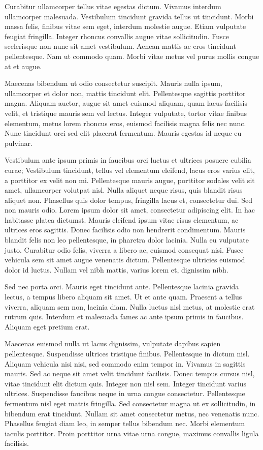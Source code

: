 Curabitur ullamcorper tellus vitae egestas dictum. Vivamus interdum ullamcorper
malesuada. Vestibulum tincidunt gravida tellus ut tincidunt. Morbi massa felis,
finibus vitae sem eget, interdum molestie augue. Etiam vulputate feugiat
fringilla. Integer rhoncus convallis augue vitae sollicitudin. Fusce
scelerisque non nunc sit amet vestibulum. Aenean mattis ac eros tincidunt
pellentesque. Nam ut commodo quam. Morbi vitae metus vel purus mollis congue at
et augue.

Maecenas bibendum ut odio consectetur suscipit. Mauris nulla ipsum, ullamcorper
et dolor non, mattis tincidunt elit. Pellentesque sagittis porttitor magna.
Aliquam auctor, augue sit amet euismod aliquam, quam lacus facilisis velit, et
tristique mauris sem vel lectus. Integer vulputate, tortor vitae finibus
elementum, metus lorem rhoncus eros, euismod facilisis magna felis nec nunc.
Nunc tincidunt orci sed elit placerat fermentum. Mauris egestas id neque eu
pulvinar.

Vestibulum ante ipsum primis in faucibus orci luctus et ultrices posuere
cubilia curae; Vestibulum tincidunt, tellus vel elementum eleifend, lacus eros
varius elit, a porttitor ex velit non mi. Pellentesque mauris augue, porttitor
sodales velit sit amet, ullamcorper volutpat nisl. Nulla aliquet neque risus,
quis blandit risus aliquet non. Phasellus quis dolor tempus, fringilla lacus
et, consectetur dui. Sed non mauris odio. Lorem ipsum dolor sit amet,
consectetur adipiscing elit. In hac habitasse platea dictumst. Mauris eleifend
ipsum vitae risus elementum, ac ultrices eros sagittis. Donec facilisis odio
non hendrerit condimentum. Mauris blandit felis non leo pellentesque, in
pharetra dolor lacinia. Nulla eu vulputate justo. Curabitur odio felis, viverra
a libero ac, euismod consequat nisi. Fusce vehicula sem sit amet augue
venenatis dictum. Pellentesque ultricies euismod dolor id luctus. Nullam vel
nibh mattis, varius lorem et, dignissim nibh.

Sed nec porta orci. Mauris eget tincidunt ante. Pellentesque lacinia gravida
lectus, a tempus libero aliquam sit amet. Ut et ante quam. Praesent a tellus
viverra, aliquam sem non, lacinia diam. Nulla luctus nisl metus, at molestie
erat rutrum quis. Interdum et malesuada fames ac ante ipsum primis in faucibus.
Aliquam eget pretium erat.

Maecenas euismod nulla ut lacus dignissim, vulputate dapibus sapien
pellentesque. Suspendisse ultrices tristique finibus. Pellentesque in dictum
nisl. Aliquam vehicula nisi nisi, sed commodo enim tempor in. Vivamus in
sagittis mauris. Sed ac neque sit amet velit tincidunt facilisis. Donec tempus
cursus nisl, vitae tincidunt elit dictum quis. Integer non nisl sem. Integer
tincidunt varius ultrices. Suspendisse faucibus neque in urna congue
consectetur. Pellentesque fermentum nisl eget mattis fringilla. Sed consectetur
magna ut ex sollicitudin, in bibendum erat tincidunt. Nullam sit amet
consectetur metus, nec venenatis nunc. Phasellus feugiat diam leo, in semper
tellus bibendum nec. Morbi elementum iaculis porttitor. Proin porttitor urna
vitae urna congue, maximus convallis ligula facilisis.

